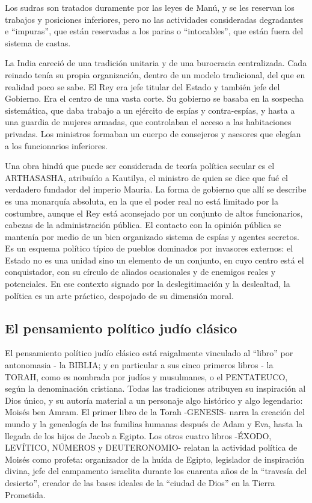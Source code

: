 \documentclass[
]{book}
\begin{document}
Los sudras son tratados duramente por las leyes de Manú, y se les reservan los trabajos y posiciones inferiores, pero no las actividades consideradas degradantes e ``impuras'', que están reservadas a los parias o ``intocables'', que están fuera del sistema de castas.

La India careció de una tradición unitaria y de una burocracia centralizada. Cada reinado tenía su propia organización, dentro de un modelo tradicional, del que en realidad poco se sabe. El Rey era jefe titular del Estado y también jefe del Gobierno. Era el centro de una vasta corte. Su gobierno se basaba en la sospecha sistemática, que daba trabajo a un ejército de espías y contra-espías, y hasta a una guardia de mujeres armadas, que controlaban el acceso a las habitaciones privadas. Los ministros formaban un cuerpo de consejeros y asesores que elegían a los funcionarios inferiores.

Una obra hindú que puede ser considerada de teoría política secular es el ARTHASASHA, atribuído a Kautilya, el ministro de quien se dice que fué el verdadero fundador del imperio Mauria. La forma de gobierno que allí se describe es una monarquía absoluta, en la que el poder real no está limitado por la costumbre, aunque el Rey está aconsejado por un conjunto de altos funcionarios, cabezas de la administración pública. El contacto con la opinión pública se mantenía por medio de un bien organizado sistema de espías y agentes secretos. Es un esquema político típico de pueblos dominados por invasores externos: el Estado no es una unidad sino un elemento de un conjunto, en cuyo centro está el conquistador, con su círculo de aliados ocasionales y de enemigos reales y potenciales. En ese contexto signado por la deslegitimación y la deslealtad, la política es un arte práctico, despojado de su dimensión moral.

\hypertarget{el-pensamiento-poluxedtico-juduxedo-cluxe1sico}{%
\subsection*{El pensamiento político judío clásico}\label{el-pensamiento-poluxedtico-juduxedo-cluxe1sico}}

El pensamiento político judío clásico está raigalmente vinculado al ``libro'' por antonomasia - la BIBLIA; y en particular a sus cinco primeros libros - la TORAH, como es nombrada por judíos y musulmanes, o el PENTATEUCO, según la denominación cristiana. Todas las tradiciones atribuyen su inspiración al Dios único, y su autoría material a un personaje algo histórico y algo legendario: Moisés ben Amram. El primer libro de la Torah -GENESIS- narra la creación del mundo y la genealogía de las familias humanas después de Adam y Eva, hasta la llegada de los hijos de Jacob a Egipto. Los otros cuatro libros -ÉXODO, LEVÍTICO, NÚMEROS y DEUTERONOMIO- relatan la actividad política de Moisés como profeta: organizador de la huída de Egipto, legislador de inspiración divina, jefe del campamento israelita durante los cuarenta años de la ``travesía del desierto'', creador de las bases ideales de la ``ciudad de Dios'' en la Tierra Prometida.
\end{document}
